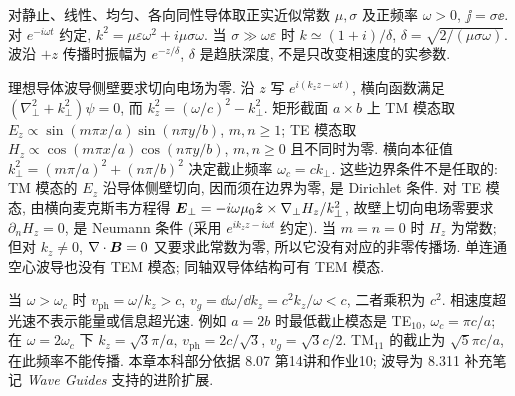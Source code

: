 对静止、线性、均匀、各向同性导体取正实近似常数 $\mu,\sigma$ 及正频率 $\omega>0$, $\jj=\sigma\ee$. 对 $e^{-i\omega t}$ 约定, $k^2=\mu\varepsilon\omega^2+i\mu\sigma\omega$. 当 $\sigma\gg\omega\varepsilon$ 时 $k\simeq(1+i)/\delta$, $\delta=\sqrt{2/(\mu\sigma\omega)}$. 波沿 $+z$ 传播时振幅为 $e^{-z/\delta}$, $\delta$ 是趋肤深度, 不是只改变相速度的实参数.

理想导体波导侧壁要求切向电场为零. 沿 $z$ 写 $e^{i(k_zz-\omega t)}$, 横向函数满足 $(\nabla_\perp^2+k_\perp^2)\psi=0$, 而 $k_z^2=(\omega/c)^2-k_\perp^2$. 矩形截面 $a\times b$ 上 TM 模态取 $E_z\propto\sin(m\pi x/a)\sin(n\pi y/b)$, $m,n\ge1$; TE 模态取 $H_z\propto\cos(m\pi x/a)\cos(n\pi y/b)$, $m,n\ge0$ 且不同时为零. 横向本征值 $k_\perp^2=(m\pi/a)^2+(n\pi/b)^2$ 决定截止频率 $\omega_c=ck_\perp$. 这些边界条件不是任取的: TM 模态的 $E_z$ 沿导体侧壁切向, 因而须在边界为零, 是 Dirichlet 条件. 对 TE 模态, 由横向麦克斯韦方程得 $\boldsymbol{E}_\perp=-i\omega\mu_0\hat{\boldsymbol{z}}\times\nabla_\perp H_z/k_\perp^2$, 故壁上切向电场零要求 $\partial_nH_z=0$, 是 Neumann 条件 (采用 $e^{ik_zz-i\omega t}$ 约定). 当 $m=n=0$ 时 $H_z$ 为常数; 但对 $k_z\ne0$, $\nabla\cdot\boldsymbol{B}=0$ 又要求此常数为零, 所以它没有对应的非零传播场. 单连通空心波导也没有 TEM 模态; 同轴双导体结构可有 TEM 模态.

当 $\omega>\omega_c$ 时 $v_\mathrm{ph}=\omega/k_z>c$, $v_g=\dd\omega/\dd k_z=c^2k_z/\omega<c$, 二者乘积为 $c^2$. 相速度超光速不表示能量或信息超光速. 例如 $a=2b$ 时最低截止模态是 TE$_{10}$, $\omega_c=\pi c/a$; 在 $\omega=2\omega_c$ 下 $k_z=\sqrt3\pi/a$, $v_\mathrm{ph}=2c/\sqrt3$, $v_g=\sqrt3c/2$. TM$_{11}$ 的截止为 $\sqrt5\pi c/a$, 在此频率不能传播. 本章本科部分依据 8.07 第14讲和作业10; 波导为 8.311 补充笔记 \textit{Wave Guides} 支持的进阶扩展.


